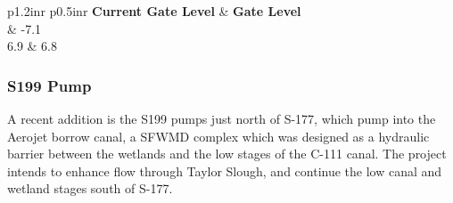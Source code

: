 \footnotesize
\begin{table}[!h]
\centering
\caption{Control strategy for S177 close (Units are ft. NGVD29)}
\label{tab:CS-S177close}
\begin{tabular}{p{1.2in}{r} p{0.5in}{r}}
\hline
\textbf{Current Gate Level} & \textbf{Gate Level}\\
	& -7.1       \\
6.9	& 6.8   \\
\hline
\end{tabular}
\end{table}
\normalsize

%
%


\clearpage

\subsubsection{S199 Pump}
A recent addition is the S199 pumps just north of S-177, which pump into the Aerojet borrow canal, a SFWMD complex which was designed as a hydraulic barrier between the wetlands and the low stages of the C-111 canal.
The project intends to enhance flow through Taylor Slough, and continue the low canal and wetland stages south of S-177.


